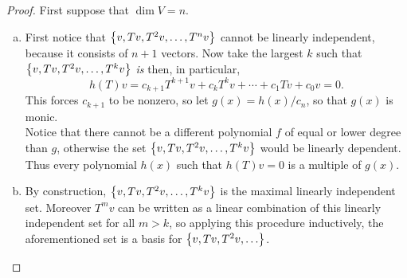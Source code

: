 \documentclass{article}
\begin{document}
\begin{proof} First suppose that $\dim V = n$.
  \begin{enumerate}[(a)]
    \item
    First notice that $\left\{ v, Tv, T^2v, \hdots, T^nv \right\}$ cannot be linearly
    independent, because it consists of $n + 1$ vectors.
    Now take the largest $k$ such that $\left\{ v, Tv, T^2v, \hdots, T^kv \right\}$
    \textit{is} then, in particular, \[
      h(T)v = c_{k+1}T^{k+1}v + c_{k}T^{k}v + \cdots + c_{1}Tv + c_0v = 0.
    \] This forces $c_{k+1}$ to be nonzero, so let $g(x) = h(x)/c_n$, so that
    $g(x)$ is monic. \\
    Notice that there cannot be a different polynomial $f$ of equal or lower
    degree than $g$,
    otherwise the set $\left\{ v, Tv, T^2v, \hdots, T^kv \right\}$ would be linearly
    dependent.
    Thus every polynomial $h(x)$ such that $h(T)v = 0$ is a multiple of $g(x)$.
    \item By construction, $\left\{ v, Tv, T^2v, \hdots, T^kv \right\}$ is the maximal
    linearly independent set. Moreover $T^mv$ can be written as a linear
    combination of this linearly independent set for all $m > k$, so applying
    this procedure inductively, the aforementioned set is a basis for
    $\left\{ v, Tv, T^2v, \hdots \right\}$.
  \end{enumerate}
\end{proof}
\begin{problem}{5} %
\end{problem}
\end{document}
